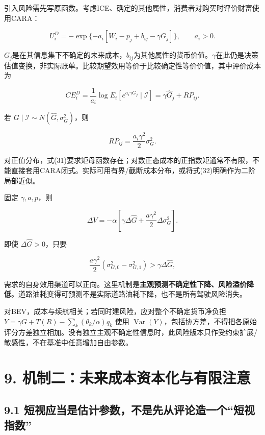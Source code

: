 \documentclass[
  11pt,
]{article}
\begin{document}
引入风险需先写原函数。考虑ICE、确定的其他属性，消费者对购买时评价财富使用CARA：

\[
U_i^D=-\exp\{-a_i[W_i-p_j+b_{ij}-\gamma G_j]\},
\qquad a_i>0. \tag{30}
\]

\(G_j\)是在其信息集下不确定的未来成本，\(b_{ij}\)为其他属性的货币价值。\(\gamma\)在此仍是决策估值变换，非实际账单。比较期望效用等价于比较确定性等价价值，其中评价成本为

\[
CE_i^D=\frac1{a_i}\log E_i[e^{a_i\gamma G_j}\mid\mathcal I]
=\gamma\widehat G_j+RP_{ij}. \tag{31}
\]

若 \(G\mid\mathcal I\sim N(\widehat G,\sigma_G^2)\)，则

\[
RP_{ij}=\frac{a_i\gamma^2}{2}\sigma_G^2. \tag{32}
\]

对正值分布，式(31)要求矩母函数存在；对数正态成本的正指数矩通常不有限，不能直接套用CARA闭式。实际可用有界/截断成本分布，或将式(32)明确作为二阶局部近似。

固定 \(\gamma,a,p\)，则

\[
\Delta V=-\alpha\left[
\gamma\Delta\widehat G+\frac{a\gamma^2}{2}\Delta\sigma_G^2
\right]. \tag{33}
\]

即使 \(\Delta\widehat G>0\)，只要

\[
\frac{a\gamma^2}{2}(\sigma_{G,0}^2-\sigma_{G,1}^2)
>\gamma\Delta\widehat G,
\tag{34}
\]

需求的自身效用渠道可以正向。这里机制是\textbf{主观预测不确定性下降、风险溢价降低}。道路油耗变得可预测不是实际道路油耗下降，也不是所有驾驶风险消失。

对BEV，成本与续航相关；若同时建风险，应对整个不确定货币净负担
\(Y=\gamma G+T(R)-\sum_k(\theta_k/\alpha)q_k\) 使用
\(\operatorname{Var}(Y)\)，包括协方差，不得把各原始评分方差独立相加。没有独立主观不确定性信息时，此风险版本只作受约束扩展/敏感性，不在基准中任意增加自由参数。

\section{9.
机制二：未来成本资本化与有限注意}\label{ux673aux5236ux4e8cux672aux6765ux6210ux672cux8d44ux672cux5316ux4e0eux6709ux9650ux6ce8ux610f}

\subsection{9.1
短视应当是估计参数，不是先从评论造一个``短视指数''}\label{ux77edux89c6ux5e94ux5f53ux662fux4f30ux8ba1ux53c2ux6570ux4e0dux662fux5148ux4eceux8bc4ux8bbaux9020ux4e00ux4e2aux77edux89c6ux6307ux6570}
\end{document}
